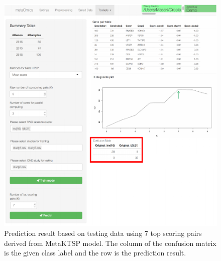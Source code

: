 \documentclass{article}
\begin{document}
\begin{figure}[H]
\begin{center}
\includegraphics[scale=0.7]{./figure/MetaKTSP/Figure12.pdf}
\caption{Prediction result based on testing data using 7 top scoring pairs derived from MetaKTSP model. The column of the confusion matrix is the given class label and the row is the prediction result.}
\label{fig:Confusion}
\end{center}
\end{figure}



 



 
\end{document}

